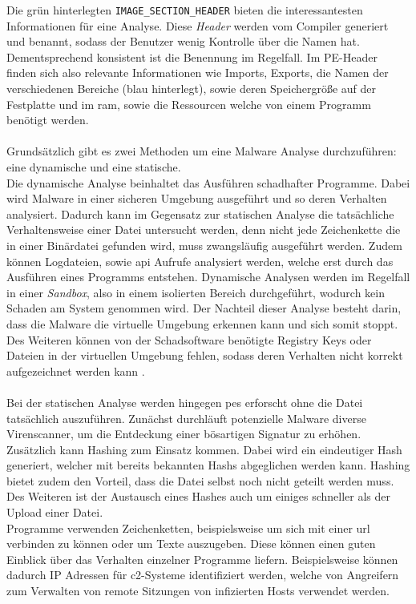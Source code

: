 \documentclass[
    12pt, %
    DIV10,
    ngerman, %
    a4paper, %
    oneside, %
    titlepage, %
    parskip=half, %
    headings=normal, %
    listof=totoc, %
    bibliography=totoc, %
    index=totoc, %
    captions=tableheading, %
    final %
]{scrreprt}
\begin{document}
Die grün hinterlegten \texttt{IMAGE\_SECTION\_HEADER} bieten die interessantesten Informationen für eine Analyse. Diese \emph{Header} werden vom Compiler generiert und benannt, sodass der Benutzer wenig Kontrolle über die Namen hat. Dementsprechend konsistent ist die Benennung im Regelfall. Im PE-Header finden sich also relevante Informationen wie Imports, Exports, die Namen der verschiedenen Bereiche (blau hinterlegt), sowie deren Speichergrö{\ss}e auf der Festplatte und im \ac{ram}, sowie die Ressourcen welche von einem Programm benötigt werden.
\\\\
Grundsätzlich gibt es zwei Methoden um eine Malware Analyse durchzuführen: eine dynamische und eine statische.\\
Die dynamische Analyse beinhaltet das Ausführen schadhafter Programme. Dabei wird Malware in einer sicheren Umgebung ausgeführt und so deren Verhalten analysiert. Dadurch kann im Gegensatz zur statischen Analyse die tatsächliche Verhaltensweise einer Datei untersucht werden, denn nicht jede Zeichenkette die in einer Binärdatei gefunden wird, muss zwangsläufig ausgeführt werden. Zudem können Logdateien, sowie \ac{api} Aufrufe analysiert werden, welche erst durch das Ausführen eines Programms entstehen.
Dynamische Analysen werden im Regelfall in einer \emph{Sandbox}, also in einem isolierten Bereich durchgeführt, wodurch kein Schaden am System genommen wird.
Der Nachteil dieser Analyse besteht darin, dass die Malware die virtuelle Umgebung erkennen kann und sich somit stoppt. Des Weiteren können von der Schadsoftware benötigte Registry Keys oder Dateien in der virtuellen Umgebung fehlen, sodass deren Verhalten nicht korrekt aufgezeichnet werden kann \parencite{Sikorski2012}.\\\\
Bei der statischen Analyse werden hingegen \ac{pes} erforscht ohne die Datei tatsächlich auszuführen. Zunächst durchläuft potenzielle Malware diverse Virenscanner, um die Entdeckung einer bösartigen Signatur zu erhöhen.\\ 
Zusätzlich kann Hashing zum Einsatz kommen. Dabei wird ein eindeutiger Hash generiert, welcher mit bereits bekannten Hashs abgeglichen werden kann. Hashing bietet zudem den Vorteil, dass die Datei selbst noch nicht geteilt werden muss. Des Weiteren ist der Austausch eines Hashes auch um einiges schneller als der Upload einer Datei.\\
Programme verwenden Zeichenketten, beispielsweise um sich mit einer \ac{url} verbinden zu können oder um Texte auszugeben. Diese können einen guten Einblick über das Verhalten einzelner Programme liefern. Beispielsweise können dadurch IP Adressen für \ac{c2}-Systeme identifiziert werden, welche von Angreifern zum Verwalten von remote Sitzungen von infizierten Hosts verwendet werden.\\
\end{document}
